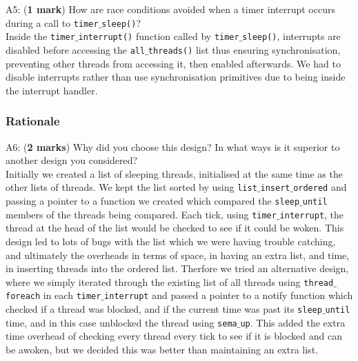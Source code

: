 \documentclass[a4paper,12pt]{article}
\begin{document}
A5: ({\bf 1 mark}) How are race conditions avoided when a timer interrupt occurs during a call to \texttt{timer$\_$sleep()}? \\

Inside the \texttt{timer$\_$interrupt()} function called by \texttt{timer$\_$sleep()}, interrupts are disabled before accessing the \texttt{all$\_$threads()} list thus ensuring synchronisation, preventing other threads from accessing it, then enabled afterwards. We had to disable interrupts rather than use synchronisation primitives due to being inside the interrupt handler. \\

\subsubsection*{Rationale}
A6: ({\bf 2 marks}) Why did you choose this design?
In what ways is it superior to another design you considered? \\

Initially we created a list of sleeping threads, initialised at the same time as the other lists of threads. We kept the list sorted by using \texttt{list$\_$insert$\_$ordered} and passing a pointer to a function we created which compared the \texttt{sleep$\_$until} members of the threads being compared. Each tick, using \texttt{timer$\_$interrupt}, the thread at the head of the list would be checked to see if it could be woken. This design led to lots of bugs with the list which we were having trouble catching, and ultimately the overheads in terms of space, in having an extra list, and time, in inserting threads into the ordered list. Therfore we tried an alternative design, where we simply iterated through the existing list of all threads using \texttt{thread$\_$foreach} in each \texttt{timer$\_$interrupt} and passed a pointer to a notify function which checked if a thread was blocked, and if the current time was past its \texttt{sleep$\_$until} time, and in this case unblocked the thread using \texttt{sema$\_$up}. This added the extra time overhead of checking every thread every tick to see if it is blocked and can be awoken, but we decided this was better than maintaining an extra list.
\end{document}
